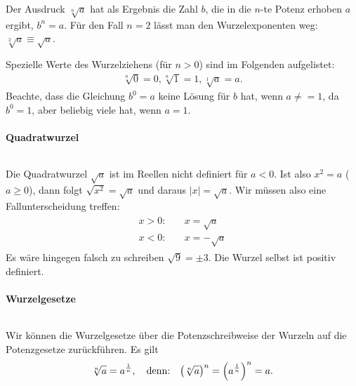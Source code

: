 Der Ausdruck $\sqrt[n]{a}$ hat als Ergebnis die Zahl $b$, die in die $n$-te Potenz erhoben $a$ ergibt, $b^n = a$. Für den Fall $n=2$ lässt man den Wurzelexponenten weg: $\sqrt[2]{a} \equiv \sqrt{a}$.

Spezielle Werte des Wurzelziehens (für $n> 0$) sind im Folgenden aufgelistet: 
\begin{align}
    \sqrt[n]{0} = 0, \sqrt[n]{1} = 1, \sqrt[1]{a} = a.
\end{align}
Beachte, dass die Gleichung $b^0 = a$ keine Lösung für $b$ hat, wenn $a \neq=1$, da $b^0 = 1$, aber beliebig viele hat, wenn $a=1$.

\paragraph{Quadratwurzel}$~$

Die Quadratwurzel $\sqrt{a}$ ist im Reellen nicht definiert für $a<0$. Ist also $x^2 = a$ ($a\ge0$), dann folgt $\sqrt{x^2}= \sqrt{a}$ und daraus $|x| = \sqrt{a}$. Wir müssen also eine Fallunterscheidung treffen: 
\begin{align}
    \begin{split}
        x > 0: &\quad x = \sqrt{a} \\
        x < 0: &\quad x = -\sqrt{a}
    \end{split}
\end{align}
Es wäre hingegen falsch zu schreiben $\sqrt{9} = \pm 3$. Die Wurzel selbst ist positiv definiert.

\paragraph{Wurzelgesetze}$~$

Wir können die Wurzelgesetze über die Potenzschreibweise der Wurzeln auf die Potenzgesetze zurückführen. Es gilt 
\begin{align}
    \sqrt[n]{a} = a^{\frac{1}{n}}, \qq{denn:} \qty(\sqrt[n]{a})^n = \qty(a^{\frac{1}{n}})^n = a.
\end{align}

